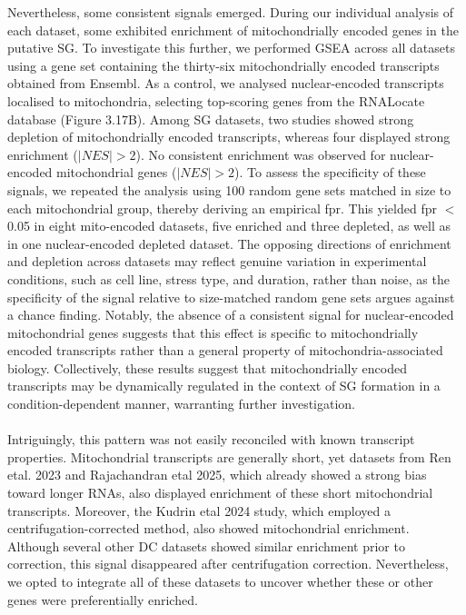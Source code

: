 Nevertheless, some consistent signals emerged. During our individual analysis of each dataset, some exhibited enrichment of mitochondrially encoded genes in the putative SG. To investigate this further, we performed GSEA across all datasets using a gene set containing the thirty-six mitochondrially encoded transcripts obtained from Ensembl\cite{cunningham_ensembl_2022}. As a control, we analysed nuclear-encoded transcripts localised to mitochondria, selecting top-scoring genes from the RNALocate database\cite{wu_rnalocate_2025} (Figure 3.17B). Among SG datasets, two studies showed strong depletion of mitochondrially encoded transcripts, whereas four displayed strong enrichment ($|NES| > 2$). No consistent enrichment was observed for nuclear-encoded mitochondrial genes ($|NES| > 2$). To assess the specificity of these signals, we repeated the analysis using 100 random gene sets matched in size to each mitochondrial group, thereby deriving an empirical \gls{fpr}. This yielded \gls{fpr} $<$0.05 in eight mito-encoded datasets, five enriched and three depleted, as well as in one nuclear-encoded depleted dataset. The opposing directions of enrichment and depletion across datasets may reflect genuine variation in experimental conditions, such as cell line, stress type, and duration, rather than noise, as the specificity of the signal relative to size-matched random gene sets argues against a chance finding. Notably, the absence of a consistent signal for nuclear-encoded mitochondrial genes suggests that this effect is specific to mitochondrially encoded transcripts rather than a general property of mitochondria-associated biology. Collectively, these results suggest that mitochondrially encoded transcripts may be dynamically regulated in the context of SG formation in a condition-dependent manner, warranting further investigation.
\\
\\
Intriguingly, this pattern was not easily reconciled with known transcript properties. Mitochondrial transcripts are generally short, yet datasets from Ren \gls{etal}. 2023\cite{ren_profiling_2023} and Rajachandran \gls{etal} 2025\cite{rajachandran_subcellular_2025}, which already showed a strong bias toward longer RNAs, also displayed enrichment of these short mitochondrial transcripts. Moreover, the Kudrin \gls{etal} 2024 study\cite{kudrin_n4-acetylcytidine_2024}, which employed a centrifugation-corrected method, also showed mitochondrial enrichment. Although several other DC datasets showed similar enrichment prior to correction, this signal disappeared after centrifugation correction. Nevertheless, we opted to integrate all of these datasets to uncover whether these or other genes were preferentially enriched.
